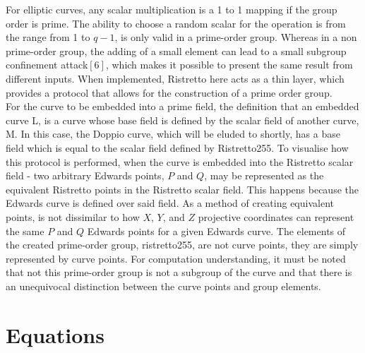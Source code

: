 \documentclass{article}
\begin{document}
For elliptic curves, any scalar multiplication is a 1 to 1 mapping if the group order is prime. The ability to choose a random scalar for the operation is from the range from 1 to $q-1$, is only valid in a prime-order group. Whereas in a non prime-order group, the adding of a small element can lead to a small subgroup confinement attack$[6]$, which makes it possible to present the same result from different inputs. When implemented, Ristretto here acts as a thin layer, which provides a protocol that allows for the construction of a prime order group.  \\
For the curve to be embedded into a prime field, the definition that an embedded curve L, is a curve whose base field is defined by the scalar field of another curve, M. In this case, the Doppio curve, which will be eluded to shortly, has a base field which is equal to the scalar field defined by Ristretto255. To visualise how this protocol is performed, when the curve is embedded into the Ristretto scalar field - two arbitrary Edwards points, $P$ and $Q$, may be represented as the equivalent Ristretto points in the Ristretto scalar field. This happens because the Edwards curve is defined over said field. As a method of creating equivalent points, is not dissimilar to how $X$, $Y$, and $Z$ projective coordinates can represent the same $P$ and $Q$ Edwards points for a given Edwards curve. The elements of the created prime-order group, ristretto255, are not curve points, they are simply represented by curve points. For computation understanding, it must be noted that not this prime-order group is not a subgroup of the curve and that there is an unequivocal distinction between the curve points and group elements. 
\section{Equations}
\end{document}
